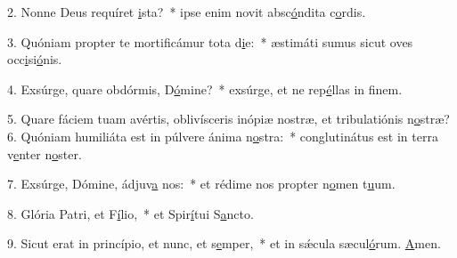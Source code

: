 2. Nonne Deus requíret \uline{i}sta?~* ipse enim novit absc\uline{ó}ndita c\uline{o}rdis.\par 
3. Quóniam propter te mortificámur tota d\uline{i}e:~* æstimáti sumus sicut oves occ\uline{i}si\uline{ó}nis.\par 
4. Exsúrge, quare obdórmis, D\uline{ó}mine?~* exsúrge, et ne rep\uline{é}llas in f\uline{i}nem.\par 
5. Quare fáciem tuam avértis, oblivísceris inópiæ nostræ, et tribulatiónis n\uline{o}stræ?
6. Quóniam humiliáta est in púlvere ánima n\uline{o}stra:~* conglutinátus est in terra v\uline{e}nter n\uline{o}ster.\par 
7. Exsúrge, Dómine, ádjuv\uline{a} nos:~* et rédime nos propter n\uline{o}men t\uline{u}um.\par 
8. Glória Patri, et F\uline{í}lio,~* et Spir\uline{í}tui S\uline{a}ncto.\par 
9. Sicut erat in princípio, et nunc, et s\uline{e}mper,~* et in sǽcula sæcul\uline{ó}rum. \uline{A}men.\par 
